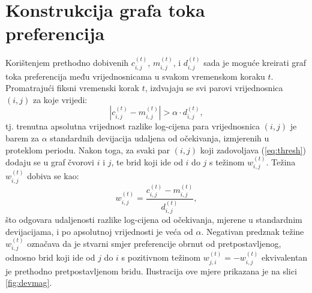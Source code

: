 \documentclass[lmodern, utf8, diplomski, numeric]{fer}
\newcommand{\q}{\left}
\newcommand{\w}{\right}
\begin{document}
  \section{Konstrukcija grafa toka preferencija}
  \label{sub:creating-graph}
  Korištenjem prethodno dobivenih $c_{i,j}^{\q(t\w)}$, $m_{i,j}^{\q(t\w)}$, i $d_{i,j}^{\q(t\w)}$ sada je moguće kreirati graf toka preferencija među vrijednosnicama u svakom vremenskom koraku $t$.
  Promatrajući fiksni vremenski korak $t$, izdvajaju se svi parovi vrijednosnica $(i,j)$ za koje vrijedi:
  \begin{equation}
  \label{eq:thresh}
  \q\lvert c_{i,j}^{\q(t\w)} - m_{i,j}^{\q(t\w)} \w\rvert > \alpha \cdot d_{i,j}^{\q(t\w)},
  \end{equation}
  tj. trenutna apsolutna vrijednost razlike log-cijena para vrijednosnica $(i,j)$ je barem za $\alpha$ standardnih devijacija udaljena od očekivanja, izmjerenih u proteklom periodu.
  Nakon toga, za svaki par $(i,j)$ koji zadovoljava (\ref{eq:thresh}) dodaju se u graf čvorovi $i$ i $j$, te brid koji ide od $i$ do $j$ s težinom $w_{i,j}^{\q(t\w)}$.
  Težina $w_{i,j}^{\q(t\w)}$ dobiva se kao:
  \begin{equation}
  \label{eq:weight}
  w_{i,j}^{\q(t\w)} = \frac{c_{i,j}^{\q(t\w)} - m_{i,j}^{\q(t\w)}}{d_{i,j}^{\q(t\w)}},
  \end{equation}
  što odgovara udaljenosti razlike log-cijena od očekivanja, mjerene u standardnim devijacijama, i po apsolutnoj vrijednosti je veća od $\alpha$.
  Negativan predznak težine $w_{i,j}^{\q(t\w)}$ označava da je stvarni smjer preferencije obrnut od pretpostavljenog, odnosno brid koji ide od $j$ do $i$ s pozitivnom težinom $w_{j,i}^{\q(t\w)} = -w_{i,j}^{\q(t\w)}$ ekvivalentan je prethodno pretpostavljenom bridu.
  Ilustracija ove mjere prikazana je na slici \ref{fig:devmag}.
  
\end{document}

